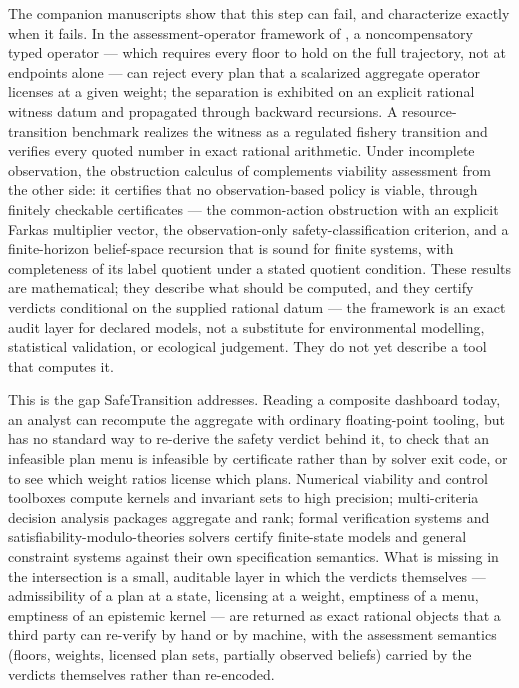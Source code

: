 \documentclass[3p,11pt]{elsarticle}
\begin{document}
The companion manuscripts show that this step can fail, and characterize
exactly when it fails. In the assessment-operator framework of \citet{Abaee2026a},
a noncompensatory typed operator --- which requires every floor to hold on
the full trajectory, not at endpoints alone --- can reject every plan that a
scalarized aggregate operator licenses at a given weight; the separation is
exhibited on an explicit rational witness datum and propagated through
backward recursions. A resource-transition benchmark realizes the witness as
a regulated fishery transition and verifies every quoted number in exact
rational arithmetic. Under incomplete observation, the obstruction calculus
of \citet{Abaee2026b} complements viability assessment from the other side: it
certifies that no observation-based policy is viable, through finitely
checkable certificates --- the common-action obstruction with an explicit
Farkas multiplier vector, the observation-only safety-classification
criterion, and a finite-horizon belief-space recursion that is sound for
finite systems, with completeness of its label quotient under a stated
quotient condition. These results are mathematical; they describe what
should be computed, and they certify verdicts conditional on the supplied
rational datum --- the framework is an exact audit layer for declared
models, not a substitute for environmental modelling, statistical
validation, or ecological judgement. They do not yet describe a tool
that computes it.

This is the gap SafeTransition addresses. Reading a composite dashboard
today, an analyst can recompute the aggregate with ordinary floating-point
tooling, but has no standard way to re-derive the safety verdict behind it,
to check that an infeasible plan menu is infeasible by certificate rather
than by solver exit code, or to see which weight ratios license which plans.
Numerical viability and control toolboxes compute kernels and invariant sets
to high precision; multi-criteria decision analysis packages aggregate and
rank; formal verification systems and satisfiability-modulo-theories solvers
certify finite-state models and general constraint systems against their own
specification semantics. What is missing in the intersection is a small,
auditable layer in which the verdicts themselves --- admissibility of a plan
at a state, licensing at a weight, emptiness of a menu, emptiness of an
epistemic kernel --- are returned as exact rational objects that a third
party can re-verify by hand or by machine, with the assessment semantics
(floors, weights, licensed plan sets, partially observed beliefs) carried by
the verdicts themselves rather than re-encoded.
\end{document}
